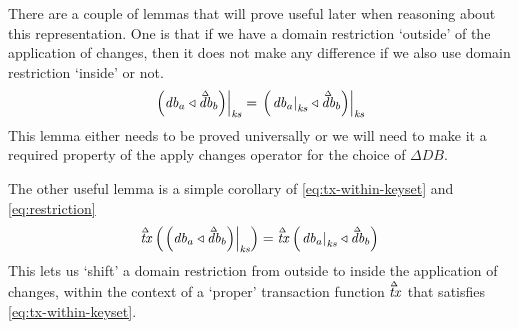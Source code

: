 \documentclass[11pt,a4paper]{article}
\newcommand\restrict[2]{\left.#1\right|_{#2}}
\newcommand\deltavar[1]{\accentset{\Delta}{#1}}
\begin{document}
There are a couple of lemmas that will prove useful later when reasoning about
this representation. One is that if we have a domain restriction `outside' of
the application of changes, then it does not make any difference if we also use
domain restriction `inside' or not.
\begin{equation}
\label{eq:restriction}
  \restrict{\left(\mathit{db}_a \triangleleft \deltavar{\mathit{db}}_b\right)}{\mathit{ks}}
=
  \restrict{\left(\restrict{\mathit{db}_a}{\mathit{ks}} \triangleleft \deltavar{\mathit{db}}_b\right)}{\mathit{ks}}
\end{equation}
This lemma either needs to be proved universally or we will need to make it a
required property of the apply changes operator for the choice of $\Delta\mathit{DB}$.

The other useful lemma is a simple corollary of \cref{eq:tx-within-keyset} and
\cref{eq:restriction}
\begin{equation}
\label{eq:restriction_corollary}
  \deltavar{\mathit{tx}}\left(\restrict{\left(\mathit{db}_a \triangleleft \deltavar{\mathit{db}}_b\right)}{\mathit{ks}}\right)
=
  \deltavar{\mathit{tx}}\left(\restrict{\mathit{db}_a}{\mathit{ks}} \triangleleft \deltavar{\mathit{db}}_b\right)
\end{equation}
This lets us `shift' a domain restriction from outside to inside the application
of changes, within the context of a `proper' transaction function
$\deltavar{\mathit{tx}}$ that satisfies \cref{eq:tx-within-keyset}.
\end{document}
